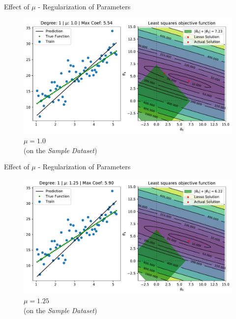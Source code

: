 \documentclass{beamer}
\begin{document}
\begin{frame}{Effect of $\mu$ - Regularization of Parameters}
\vspace{0.4cm}
\begin{figure}

\includegraphics[width=0.9\linewidth]{../assets/lasso-regression/figures/lasso_1.0.pdf}
\caption{$\mu = 1.0$\\(on the \emph{Sample Dataset})}
\end{figure}
\end{frame}

\begin{frame}{Effect of $\mu$ - Regularization of Parameters}
\vspace{0.4cm}
\begin{figure}\includegraphics[width=0.9\linewidth]{../assets/lasso-regression/figures/lasso_1.25.pdf}\caption{$\mu = 1.25$\\(on the \emph{Sample Dataset})}
\end{figure}
\end{frame}
\end{document}
